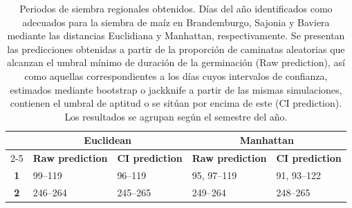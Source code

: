 \begin{table}[!h]
\begin{tabular}{cclll}
		\multicolumn{1}{c|}{}                                   & \multicolumn{2}{c|}{\textbf{Euclidean}}                                                                                                                                                                            & \multicolumn{2}{c}{\textbf{Manhattan}}                                                    \\ \cline{2-5} 
		\multicolumn{1}{c|}{}                                   & \multicolumn{1}{c|}{\textbf{Raw prediction}}                                                    & \multicolumn{1}{c|}{\textbf{CI prediction}}                                                                      & \multicolumn{1}{c|}{\textbf{Raw prediction}} & \multicolumn{1}{c}{\textbf{CI prediction}} \\ \hline
		\multicolumn{1}{c|}{\textbf{1}}                         & \multicolumn{1}{l|}{99--119}                                                                    & \multicolumn{1}{l|}{96--119}                                                                                     & \multicolumn{1}{l|}{95, 97--119}             & 91, 93--122                                \\ \hline
		\multicolumn{1}{c|}{\textbf{2}}                         & \multicolumn{1}{l|}{246--264}                                                                   & \multicolumn{1}{l|}{245--265}                                                                                    & \multicolumn{1}{l|}{249--264}                & 248--265                                   \\ \hline
	\end{tabular}
	\caption{Periodos de siembra regionales obtenidos. Días del año identificados como adecuados para la siembra de maíz en Brandemburgo, Sajonia y Baviera mediante las distancias Euclidiana y Manhattan, respectivamente. Se presentan las predicciones obtenidas a partir de la proporción de caminatas aleatorias que alcanzan el umbral mínimo de duración de la germinación (Raw prediction), así como aquellas correspondientes a los días cuyos intervalos de confianza, estimados mediante bootstrap o jackknife a partir de las mismas simulaciones, contienen el umbral de aptitud o se sitúan por encima de este (CI prediction). Los resultados se agrupan según el semestre del año.}
	\label{Tab:Sowing_windows}
\end{table}






